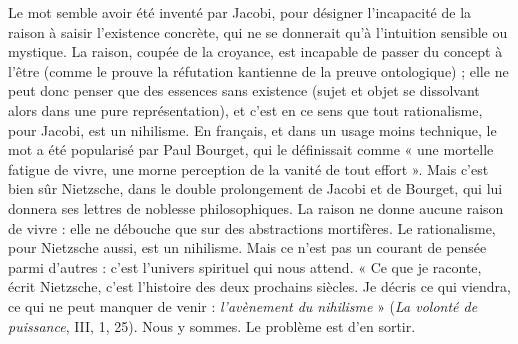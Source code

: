 Le mot semble avoir été inventé par Jacobi, pour désigner l’incapacité de la
raison à saisir l’existence concrète, qui ne se donnerait qu’à l'intuition sensible
ou mystique. La raison, coupée de la croyance, est incapable de passer du
concept à l’être (comme le prouve la réfutation kantienne de la preuve ontologique) ;
elle ne peut donc penser que des essences sans existence (sujet et
objet se dissolvant alors dans une pure représentation), et c’est en ce sens que
tout rationalisme, pour Jacobi, est un nihilisme. En français, et dans un usage
moins technique, le mot a été popularisé par Paul Bourget, qui le définissait
comme « une mortelle fatigue de vivre, une morne perception de la vanité de
tout effort ». Mais c’est bien sûr Nietzsche, dans le double prolongement de
Jacobi et de Bourget, qui lui donnera ses lettres de noblesse philosophiques. La
raison ne donne aucune raison de vivre : elle ne débouche que sur des abstractions
mortifères. Le rationalisme, pour Nietzsche aussi, est un nihilisme. Mais
ce n’est pas un courant de pensée parmi d’autres : c’est l’univers spirituel qui
nous attend. « Ce que je raconte, écrit Nietzsche, c’est l’histoire des deux prochains
siècles. Je décris ce qui viendra, ce qui ne peut manquer de venir : {\it l'avènement
du nihilisme} » ({\it La volonté de puissance}, III, 1, 25). Nous y sommes. Le
problème est d’en sortir.

